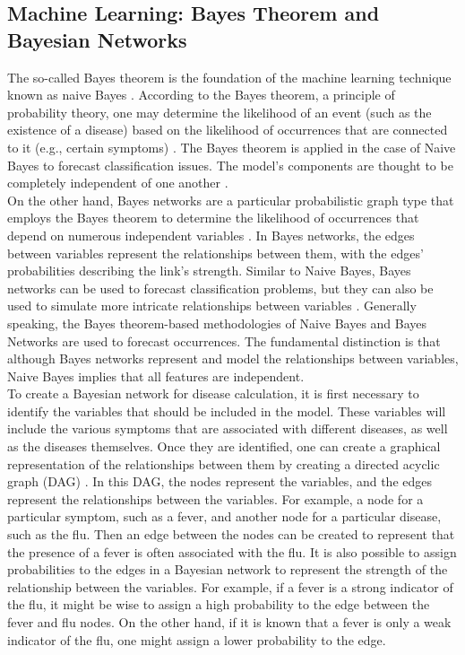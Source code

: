 \subsection{Machine Learning: Bayes Theorem and Bayesian Networks}
The so-called Bayes theorem is the foundation of the machine learning technique known as naive Bayes \cite[p. 403]{.bayes1}. According to the Bayes theorem, a principle of probability theory, one may determine the likelihood of an event (such as the existence of a disease) based on the likelihood of occurrences that are connected to it (e.g., certain symptoms) \cite[p. 403 ff.]{.bayes1} \cite{.bayes2}. The Bayes theorem is applied in the case of Naive Bayes to forecast classification issues. The model's components are thought to be completely independent of one another \cite{.naivebayes}.
\newline \\
On the other hand, Bayes networks are a particular probabilistic graph type that employs the Bayes theorem to determine the likelihood of occurrences that depend on numerous independent variables \cite{.bayesnet}. In Bayes networks, the edges between variables represent the relationships between them, with the edges' probabilities describing the link's strength. Similar to Naive Bayes, Bayes networks can be used to forecast classification problems, but they can also be used to simulate more intricate relationships between variables  \cite{.bayesnet}. Generally speaking, the Bayes theorem-based methodologies of Naive Bayes and Bayes Networks are used to forecast occurrences. The fundamental distinction is that although Bayes networks represent and model the relationships between variables, Naive Bayes implies that all features are independent. 
\newline \\
To create a Bayesian network for disease calculation, it is first necessary to identify the variables that should be included in the model. These variables will include the various symptoms that are associated with different diseases, as well as the diseases themselves. Once they are identified,  one can create a graphical representation of the relationships between them by creating a directed acyclic graph (DAG) \cite{.bayesnet} \cite{.bayesnet2}. In this DAG, the nodes represent the variables, and the edges represent the relationships between the variables. For example, a node for a particular symptom, such as a fever, and another node for a particular disease, such as the flu. Then an edge between the nodes can be created to represent that the presence of a fever is often associated with the flu. It is also possible to assign probabilities to the edges in a Bayesian network to represent the strength of the relationship between the variables. For example, if a fever is a strong indicator of the flu, it might be wise to assign a high probability to the edge between the fever and flu nodes. On the other hand, if it is known that a fever is only a weak indicator of the flu, one might assign a lower probability to the edge.
